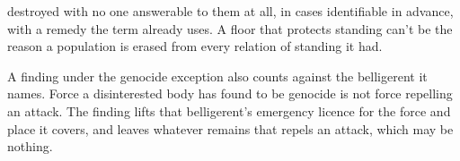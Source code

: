 destroyed with no one answerable to them at all, in cases identifiable in advance, with a remedy the term already uses. A floor that protects standing can't be the reason a population is erased from every relation of standing it had.

A finding under the genocide exception also counts against the belligerent it names. Force a disinterested body has found to be genocide is not force repelling an attack. The finding lifts that belligerent's emergency licence for the force and place it covers, and leaves whatever remains that repels an attack, which may be nothing.
